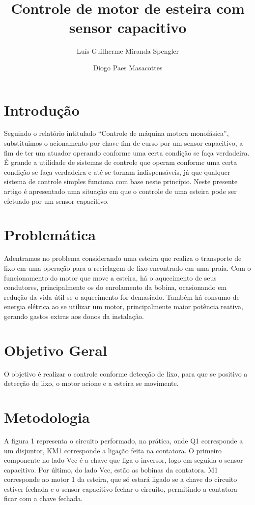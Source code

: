 \documentclass{article}
\title{Controle de motor de esteira com sensor capacitivo}
\date{}
\author[1]{Luís Guilherme Miranda Spengler}
\author[2]{Diogo Paes Masacottes}
\affil[1,2]{Instituto Federal de Educação, Ciência e Tecnologia de Mato Grosso do Sul}
\begin{document}
\maketitle

\section{Introdução}
Seguindo o relatório intitulado ``Controle de máquina motora monofásica'', substituimos o acionamento por chave fim de curso por um sensor capacitivo, a fim de ter um atuador operando conforme uma certa condição se faça verdadeira. É grande a utilidade de sistemas de controle que operam conforme uma certa condição se faça verdadeira e até se tornam indispensáveis, já que qualquer sistema de controle simples funciona com base neste princípio. Neste presente artigo é apresentado uma situação em que o controle de uma esteira pode ser efetuado por um sensor capacitivo.

\section{Problemática}

Adentramos no problema considerando uma esteira que realiza o transporte de lixo em uma operação para a reciclagem de lixo encontrado em uma praia. Com o funcionamento do motor que move a esteira, há o aquecimento de seus condutores, principalmente os do enrolamento da bobina, ocasionando em redução da vida útil se o aquecimento for demasiado. Também há consumo de energia elétrica ao se utilizar um motor, principalmente maior potência reativa, gerando gastos extras aos donos da instalação.

\section{Objetivo Geral}

O objetivo é realizar o controle conforme detecção de lixo, para que se positivo a detecção de lixo, o motor acione e a esteira se movimente.

\section{Metodologia}

A figura 1 representa o circuito performado, na prática, onde Q1 corresponde a um disjuntor, KM1 corresponde a ligação feita na contatora. O primeiro componente no lado Vcc é a chave que liga o inversor, logo em seguida o sensor capacitivo. Por último, do lado Vcc, estão as bobinas da contatora. M1 corresponde ao motor 1 da esteira, que só estará ligado se a chave do circuito estiver fechada e o sensor capacitivo fechar o circuito, permitindo a contatora ficar com a chave fechada.
\end{document}
